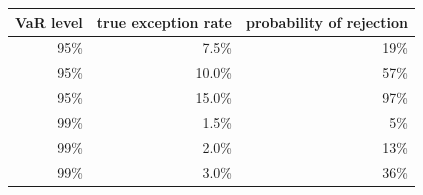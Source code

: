 \begin{tabular}{rrr}
\toprule
VaR level & true exception rate & probability of rejection \\
\midrule
95\% & 7.5\% & 19\% \\
95\% & 10.0\% & 57\% \\
95\% & 15.0\% & 97\% \\
99\% & 1.5\% & 5\% \\
99\% & 2.0\% & 13\% \\
99\% & 3.0\% & 36\% \\
\bottomrule
\end{tabular}
